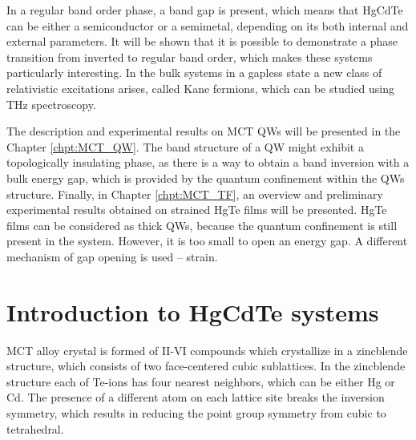 \documentclass[titlepage,a4paper]{book}
\newcommand{\wciecie}{\quad\phantom{v}}
\begin{document}
In a regular band order phase, a band gap is present, which means that HgCdTe can be either a semiconductor or a semimetal, depending on its both internal and external parameters. It will be shown that it is possible to demonstrate a phase transition from inverted to regular band order, which makes these systems particularly interesting. In the bulk systems in a gapless state a new class of relativistic excitations arises, called Kane fermions, which can be studied using THz spectroscopy.

The description and experimental results on MCT QWs will be presented in the Chapter \ref{chpt:MCT_QW}. The band structure of a QW might exhibit a topologically insulating phase, as there is a way to obtain a band inversion with a bulk energy gap, which is provided by the quantum confinement within the QWs structure.
Finally, in Chapter \ref{chpt:MCT_TF}, an overview and preliminary experimental results obtained on strained HgTe films will be presented. HgTe films can be considered as thick QWs, because the quantum confinement is still present in the system. However, it is too small to open an energy gap. A different mechanism of gap opening is used -- strain.

\section{Introduction to HgCdTe systems}
\wciecie
MCT alloy crystal is formed of II-VI compounds which crystallize in a zincblende structure, which consists of two face-centered cubic sublattices. In the zincblende structure each of Te-ions has four nearest neighbors, which can be either Hg or Cd. The presence of a different atom on each lattice site breaks the inversion symmetry, which results in reducing the point group symmetry from cubic to tetrahedral. 
\end{document}
